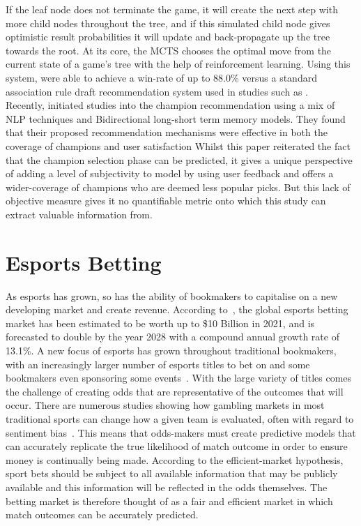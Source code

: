 If the leaf node does not terminate the game, it will create the next step with more child nodes throughout the tree, and if this simulated child node gives optimistic result probabilities it will update and back-propagate up the tree towards the root.
At its core, the \ac{MCTS} chooses the optimal move from the current state of a game's tree with the help of reinforcement learning.
Using this system, \citet{chen2018art} were able to achieve a win-rate of up to 88.0\% versus a standard association rule draft recommendation system used in studies such as \citet{hanke2017moba}. \\

Recently, \citet{shen2022deep} initiated studies into the champion recommendation using a mix of \ac{NLP} techniques and Bidirectional long-short term memory models.
They found that their proposed recommendation mechanisms were effective in both the coverage of champions and user satisfaction
Whilst this paper reiterated the fact that the champion selection phase can be predicted, it gives a unique perspective of adding a level of subjectivity to model by using user feedback and offers a wider-coverage of champions who are deemed less popular picks.
But this lack of objective measure gives it no quantifiable metric onto which this study can extract valuable information from.


\section{Esports Betting}\label{sec:Esports Betting}
As esports has grown, so has the ability of bookmakers to capitalise on a new developing market and create revenue.
According to~\citet{absolute2022esportsbet}, the global esports betting market has been estimated to be worth up to \$10 Billion in 2021, and is forecasted to double by the year 2028 with a compound annual growth rate of 13.1\%.
A new focus of esports has grown throughout traditional bookmakers, with an increasingly larger number of esports titles to bet on and some bookmakers even sponsoring some events~\citep{esportsinsider2019}.
With the large variety of titles comes the challenge of creating odds that are representative of the outcomes that will occur.
There are numerous studies showing how gambling markets in most traditional sports can change how a given team is evaluated, often with regard to sentiment bias~\citep{feddersen2018sentiment, na2019not}.
This means that odds-makers must create predictive models that can accurately replicate the true likelihood of match outcome in order to ensure money is continually being made.
According to the efficient-market hypothesis, sport bets should be subject to all available information that may be publicly available and this information will be reflected in the odds themselves\citep{even1992testing}.
The betting market is therefore thought of as a fair and efficient market in which match outcomes can be accurately predicted.\\

